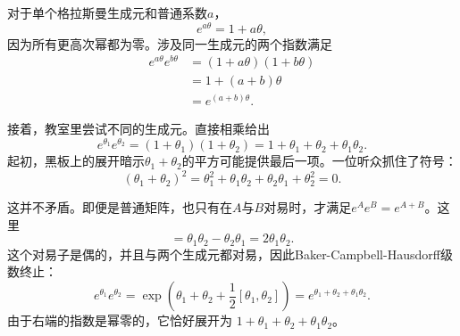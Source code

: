 对于单个格拉斯曼生成元和普通系数\(a\)，
\begin{equation}
e^{a\theta}
=1+a\theta,
\end{equation}
因为所有更高次幂都为零。涉及同一生成元的两个指数满足
\begin{align}
e^{a\theta}e^{b\theta}
&=(1+a\theta)(1+b\theta)\\
&=1+(a+b)\theta\\
&=e^{(a+b)\theta}.
\end{align}

接着，教室里尝试不同的生成元。直接相乘给出
\begin{equation}
e^{\theta_1}e^{\theta_2}
=(1+\theta_1)(1+\theta_2)
=1+\theta_1+\theta_2+\theta_1\theta_2.
\end{equation}
起初，黑板上的展开暗示\(\theta_1+\theta_2\)的平方可能提供最后一项。一位听众抓住了符号：
\begin{equation}
(\theta_1+\theta_2)^2
=\theta_1^2+\theta_1\theta_2
 +\theta_2\theta_1+\theta_2^2
=0.
\end{equation}

\begin{classroomqa}
\end{classroomqa}

这并不矛盾。即便是普通矩阵，也只有在\(A\)与\(B\)对易时，才满足\(e^Ae^B=e^{A+B}\)。这里
\begin{equation}
[\theta_1,\theta_2]
=\theta_1\theta_2-\theta_2\theta_1
=2\theta_1\theta_2.
\end{equation}
这个对易子是偶的，并且与两个生成元都对易，因此Baker-Campbell-Hausdorff级数终止：
\begin{equation}
e^{\theta_1}e^{\theta_2}
=\exp\left(
\theta_1+\theta_2+\frac12[\theta_1,\theta_2]
\right)
=e^{\theta_1+\theta_2+\theta_1\theta_2}.
\end{equation}
由于右端的指数是幂零的，它恰好展开为
\(1+\theta_1+\theta_2+\theta_1\theta_2\)。

\begin{classroomqa}
\end{classroomqa}

